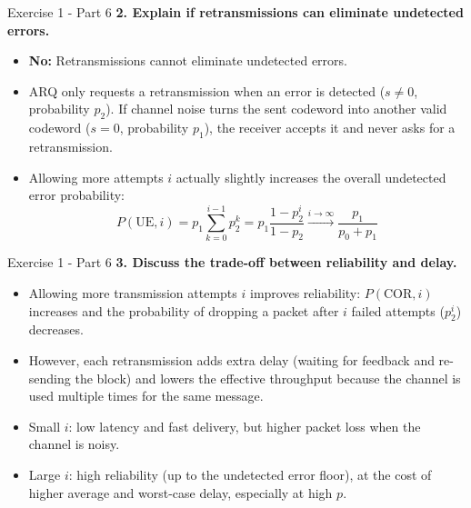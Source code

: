 \documentclass[10pt, aspectratio=169]{beamer}
\newcommand{\question}[1]{{\color{QuestionRed}\textbf{#1}}}
\begin{document}
\begin{frame}{Exercise 1 - Part 6}
	\question{2. Explain if retransmissions can eliminate undetected errors.}
	
	\vspace{0.25cm}
	\begin{itemize}
		\item \textbf{No:} Retransmissions cannot eliminate undetected errors.
		\item ARQ only requests a retransmission when an error is detected ($s \neq 0$, probability $p_2$). If channel noise turns the sent codeword into another valid codeword ($s = 0$, probability $p_1$), the receiver accepts it and never asks for a retransmission.
		\item Allowing more attempts $i$ actually slightly increases the overall undetected error probability:
		\[
		P(\text{UE}, i) = p_1 \sum_{k=0}^{i-1} p_2^k = p_1 \frac{1 - p_2^i}{1 - p_2} \xrightarrow{i \to \infty} \frac{p_1}{p_0 + p_1}
		\]
	\end{itemize}
\end{frame}

\begin{frame}{Exercise 1 - Part 6}
	\question{3. Discuss the trade-off between reliability and delay.}
	
	\vspace{0.25cm}
	\begin{itemize}
		\item Allowing more transmission attempts $i$ improves reliability: $P(\text{COR}, i)$ increases and the probability of dropping a packet after $i$ failed attempts ($p_2^i$) decreases.
		\item However, each retransmission adds extra delay (waiting for feedback and re-sending the block) and lowers the effective throughput because the channel is used multiple times for the same message.
		\item Small $i$: low latency and fast delivery, but higher packet loss when the channel is noisy.
		\item Large $i$: high reliability (up to the undetected error floor), at the cost of higher average and worst-case delay, especially at high $p$.
	\end{itemize}
\end{frame}
\end{document}
